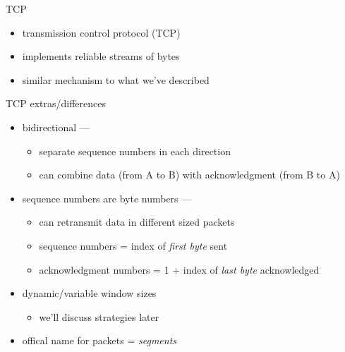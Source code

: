 \usetikzlibrary{patterns}
\begin{frame}{TCP}
    \begin{itemize}
    \item transmission control protocol (TCP)
    \item implements reliable streams of bytes
    \item similar mechanism to what we've described
    \end{itemize}
\end{frame}

\begin{frame}{TCP extras/differences}
    \begin{itemize}
    \item bidirectional ---
        \begin{itemize}
        \item separate sequence numbers in each direction
        \item can combine data (from A to B) with acknowledgment (from B to A)
        \end{itemize}
    \item sequence numbers are byte numbers ---
        \begin{itemize}
        \item can retransmit data in different sized packets
        \item sequence numbers = index of \textit{first byte} sent
        \item acknowledgment numbers = 1 + index of \textit{last byte} acknowledged
        \end{itemize}
    \item dynamic/variable window sizes
        \begin{itemize}
        \item we'll discuss strategies later
        \end{itemize}
    \item offical name for packets = \textit{segments}
    \end{itemize}
\end{frame}


